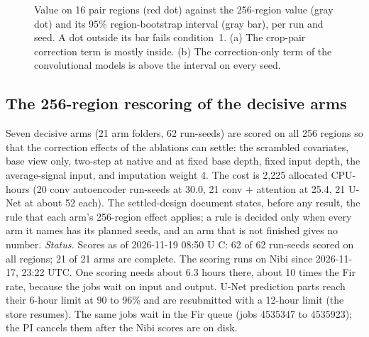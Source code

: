 \documentclass[pdflatex,sn-mathphys-num]{sn-jnl}
\newcommand{\lit}[1]{#1}
\newcommand{\cl}[1]{#1}
\newcommand{\costAE}{30.0}
\newcommand{\costAT}{25.4}
\newcommand{\costUN}{52}
\newcommand{\nRunsAE}{20}
\newcommand{\nRunsAT}{21}
\newcommand{\nRunsUN}{21}
\newcommand{\rescoreCost}{2{,}225}
\newcommand{\rescoreSeeds}{62}
\newcommand{\rescoreStatus}{Scores as of 2026-11-19 08:50 U C: 62 of 62 run-seeds scored on all regions; 21 of 21 arms are complete. The scoring runs on Nibi since 2026-11-17, 23:22 UTC. One scoring needs about 6.3 hours there, about 10 times the Fir rate, because the jobs wait on input and output. U-Net prediction parts reach their 6-hour limit at 90 to 96\% and are resubmitted with a 12-hour limit (the store resumes). The same jobs wait in the Fir queue (jobs 4535347 to 4535923); the PI cancels them after the Nibi scores are on disk.}
\begin{document}
\begin{figure}[!htbp]
\centering
{}
\caption{\cl{Value on \lit{16} pair regions (red dot) against the \lit{256}-region value (gray dot) and its \lit{95}\% region-bootstrap interval (gray bar), per run and seed. A dot outside its bar fails condition~\lit{1}. (a) The crop-pair correction term is mostly inside. (b) The correction-only term of the convolutional models is above the interval on every seed.}}\label{fig:region}
\end{figure}

\subsection{The \lit{256}-region rescoring of the decisive arms}\label{sec:rescore}

\cl{Seven decisive arms (\lit{21} arm folders, \rescoreSeeds{} run-seeds) are scored on all \lit{256} regions so that the correction effects of the ablations can settle: the scrambled covariates, base view only, two-step at native and at fixed base depth, fixed input depth, the average-signal input, and imputation weight \lit{4}. The cost is \rescoreCost{} allocated CPU-hours (\nRunsAE{} conv autoencoder run-seeds at \costAE{}, \nRunsAT{} conv + attention at \costAT{}, \nRunsUN{} U-Net at about \costUN{} each). The settled-design document states, before any result, the rule that each arm's \lit{256}-region effect applies; a rule is decided only when every arm it names has its planned seeds, and an arm that is not finished gives no number. \textit{Status.} \rescoreStatus{}}
\end{document}
